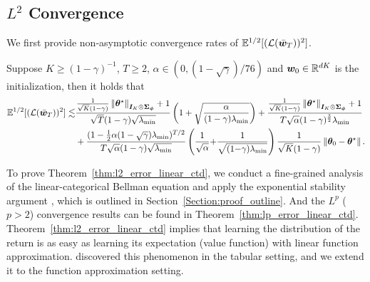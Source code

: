 \subsection{\texorpdfstring{$L^2$}{L2} Convergence}\label{Subsection:L2_convergence}
We first provide non-asymptotic convergence rates of ${\mathbb E}^{1/2}[({\mathcal{L}}(\bar{{\bm{w}}}_T))^2]$.
\begin{theorem}[$L^2$ Convergence]\label{thm:l2_error_linear_ctd}
Suppose $K\geq (1-\gamma)^{-1}$, $T\geq 2$, $\alpha\in(0,(1-\sqrt\gamma)/76)$ and ${\bm{w}}_0\in{\mathbb R}^{dK}$ is the initialization, then it holds that
    \begin{equation*}
       \begin{aligned}
        {\mathbb E}^{1/2}[({\mathcal{L}}(\bar{{\bm{w}}}_T))^2]\lesssim&\frac{\frac{1}{\sqrt{K}(1-\gamma)}\left\|{{\bm{\theta}}^{\star}}\right\|_{{\bm{I}}_K\otimes{\bm{\Sigma}}_{{\bm{\phi}}}}+1}{\sqrt{T}(1-\gamma)\sqrt{\lambda_{\min}}}\left({1+\sqrt{\frac{\alpha}{(1-\gamma)\lambda_{\min}}}}\right)+\frac{\frac{1}{\sqrt{K}(1-\gamma)}\left\|{{\bm{\theta}}^{\star}}\right\|_{{\bm{I}}_K\otimes{\bm{\Sigma}}_{{\bm{\phi}}}}+1}{T\sqrt{\alpha }(1-\gamma)^{\frac{3}{2}}\lambda_{\min}}\\
        &+\frac{(1-\frac{1}{2}\alpha (1-\sqrt\gamma)\lambda_{\min} )^{T/2}}{T \sqrt{\alpha}(1-\gamma)\sqrt{\lambda_{\min}}}\left({\frac{1}{\sqrt\alpha}{+}\frac{1}{\sqrt{ (1{-}\gamma)\lambda_{\min}}}}\right)\frac{1}{\sqrt{K}(1-\gamma)}\left\|{{\bm{\theta}}_0-{\bm{\theta}}^{\star}}\right\|.
       \end{aligned}
    \end{equation*}
\end{theorem}
To prove Theorem~\ref{thm:l2_error_linear_ctd}, we conduct a fine-grained analysis of the linear-categorical Bellman equation and apply the exponential stability argument \citep[Theorem~1][]{samsonov2024improved}, which is outlined in Section~\ref{Section:proof_outline}.
And the $L^p$ ($p>2$) convergence results can be found in Theorem~\ref{thm:lp_error_linear_ctd}.
Theorem~\ref{thm:l2_error_linear_ctd} implies that learning the distribution of the return is as easy as learning its expectation (value function) with linear function approximation.
\citet{rowland2024nearminimaxoptimal, peng2024statistical} discovered this phenomenon in the tabular setting, and we extend it to the function approximation setting.
